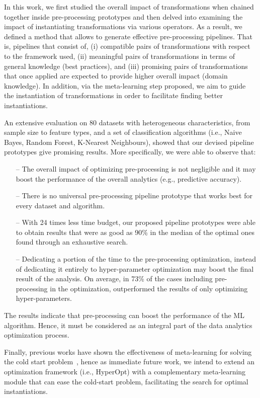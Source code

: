 In this work, we first studied the overall impact of transformations when chained together inside pre-processing prototypes and then delved into examining the impact of instantiating transformations via various operators. As a result, we defined a method that allows to generate effective pre-processing pipelines. That is, pipelines that consist of, (i) compatible pairs of transformations with respect to the framework used,  (ii) meaningful pairs of transformations in terms of general knowledge (best practices), and (iii) promising pairs of transformations that once applied are expected to provide higher overall impact (domain knowledge). 
In addition, via the meta-learning step proposed, we aim to guide the instantiation of transformations in order to facilitate finding better instantiations.

An extensive evaluation on 80 datasets with heterogeneous characteristics, from sample size to feature types, and a set of classification algorithms (i.e., Naive Bayes, Random Forest, K-Nearest Neighbours), showed that our devised pipeline prototypes give promising results. More specifically, we were able to observe that:
\begin{itemize}
    \item [--] The overall impact of optimizing pre-processing is not negligible and it may boost the performance of the overall analytics (e.g., predictive accuracy).
    \item [--] There is no universal pre-processing pipeline prototype that works best for every dataset and algorithm.
    \item [--] With 24 times less time budget, our proposed pipeline prototypes were able to obtain results that were as good as 90\% in the median of the optimal ones found through an exhaustive search.
    \item [--] Dedicating a portion of the time to the pre-processing optimization, instead of dedicating it entirely to hyper-parameter optimization may boost %
    the final result of the analysis. On average, in 73\% of the cases including pre-processing in the optimization, outperformed the results of only optimizing hyper-parameters.
\end{itemize}

The results indicate that pre-processing can boost the performance of the ML algorithm. Hence, it must be considered as an integral part of the data analytics optimization process. 

Finally, previous works have shown the effectiveness of meta-learning for solving the cold start problem~\cite{Feurer15AAAI}, hence as immediate future work, we intend to extend an optimization framework (i.e., HyperOpt) with a complementary meta-learning module that can ease the cold-start problem, facilitating the search for optimal instantiations.